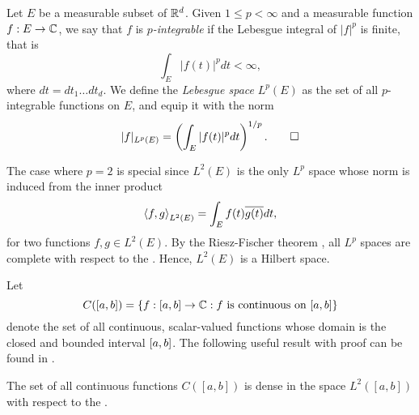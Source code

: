 \documentclass[../thesis.tex]{subfiles}
\begin{document}
\begin{definition} %
    Let $E$ be a measurable subset of $\mathbb{R}^d$. Given $1 \leq p < \infty$ and a measurable function $f:E\rightarrow \mathbb{C}$, we say that $f$ is \emph{$p$-integrable} if the Lebesgue integral of $|f|^p$ is finite, that is
    \begin{equation*}
        \int_{E} |f(t)|^p dt < \infty,
    \end{equation*}
    where $dt= dt_1 \dots dt_d$. We define the \emph{Lebesgue space} $L^p(E)$ as the set of all $p$-integrable functions on $E$, and equip it with the norm
    \begin{equation*}
        |f|_{L^p(E)} = \left(\int_{E} |f(t)|^p dt\right)^{1/p}. \qedhere
    \end{equation*}
\end{definition}

The case where $p=2$ is special since $L^2(E)$ is the only $L^p$ space whose norm is induced from the inner product
\begin{equation}
    \left \langle f, g \right \rangle_{L^2(E)} = \int_{E} f(t)\overline{g(t)} dt,
\end{equation}
for two functions $f,g\in L^2(E)$. By the Riesz-Fischer theorem \cite[p.~279]{heilIntroductionRealAnalysis2019}, all $L^p$ spaces are complete with respect to the \LPnorm. Hence, $L^2(E)$ is a Hilbert space. 

Let
\begin{equation}
    C([a,b]) = \{f:[a,b] \rightarrow \mathbb{C}: f \text{ is continuous on } [a,b]\}
\end{equation}
denote the set of all continuous, scalar-valued functions whose domain is the closed and bounded interval $[a,b]$. The following useful result with proof can be found in \cite[p.~326]{rudinPrinciplesMathematicalAnalysis20}. 
\begin{lemma}\label{lem:c_dense_L2}
    The set of all continuous functions $C([a,b])$ is dense in the space $L^2([a,b])$ with respect to the \Ltwonorm.
\end{lemma}
\end{document}
